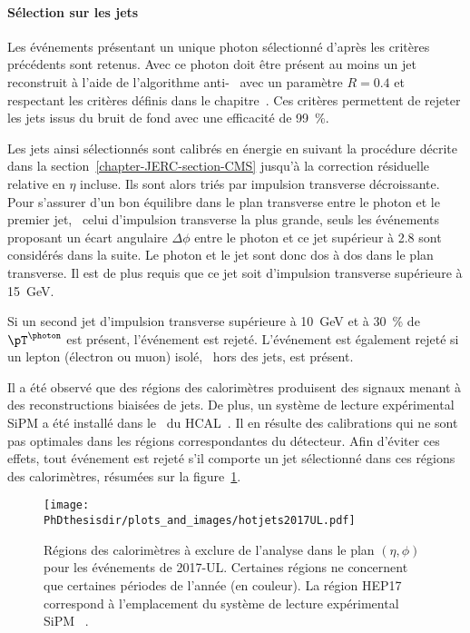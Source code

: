 \paragraph{Sélection sur les jets}
Les événements présentant un unique photon sélectionné d'après les critères précédents sont retenus.
Avec ce photon doit être présent au moins un jet reconstruit à l'aide de l'algorithme anti-\kT~\cite{Cacciari_antikT} avec un paramètre $R=\num{0.4}$ et respectant les critères définis dans le chapitre~.
Ces critères permettent de rejeter les jets issus du bruit de fond avec une efficacité de \SI{99}{\%}.
\par Les jets ainsi sélectionnés sont calibrés en énergie en suivant la procédure décrite dans la section~\ref{chapter-JERC-section-CMS} jusqu'à la correction résiduelle relative en $\eta$ incluse. Ils sont alors triés par impulsion transverse décroissante.
Pour s'assurer d'un bon équilibre dans le plan transverse entre le photon et le premier jet, \ie\ celui d'impulsion transverse la plus grande, seuls les événements proposant un écart angulaire $\Delta\phi$ entre le photon et ce jet supérieur à \SI{2.8}{\rad} sont considérés dans la suite.
Le photon et le jet sont donc dos à dos dans le plan transverse.
Il est de plus requis que ce jet soit d'impulsion transverse supérieure à \SI{15}{\GeV}.
\par Si un second jet d'impulsion transverse supérieure à \SI{10}{\GeV} et à \SI{30}{\%} de $\pT^{\photon}$ est présent, l'événement est rejeté.
L'événement est également rejeté si un lepton (électron ou muon) isolé, \ie\ hors des jets, est présent.
\par Il a été observé que des régions des calorimètres produisent des signaux menant à des reconstructions biaisées de jets.
De plus, un système de lecture expérimental \og SiPM \fg{} a été installé dans le \CMSendcap\ du HCAL~\cite{SiPM_CMS_conf}.
Il en résulte des calibrations qui ne sont pas optimales dans les régions correspondantes du détecteur.
Afin d'éviter ces effets, tout événement est rejeté s'il comporte un jet sélectionné dans ces régions des calorimètres, résumées sur la figure~\ref{fig-hotjets2017UL}.
\begin{figure}[h]
\centering
\texttt{[image: \\PhDthesisdir/plots\_and\_images/hotjets2017UL.pdf]}
\caption[Régions des calorimètres à exclure de l'analyse dans le plan $(\eta, \phi)$.]{Régions des calorimètres à exclure de l'analyse dans le plan $(\eta, \phi)$ pour les événements de 2017-UL. Certaines régions ne concernent que certaines périodes de l'année (en couleur). La région \og HEP17 \fg{} correspond à l'emplacement du système de lecture expérimental \og SiPM \fg~\cite{SiPM_CMS_conf}.}
\label{fig-hotjets2017UL}
\end{figure}
